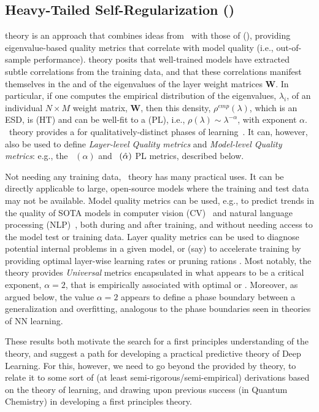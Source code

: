 \subsection{Heavy-Tailed Self-Regularization (\HTSR)}

\HTSR theory is an approach that combines ideas from \STATMECH~with those of \emph{\HeavyTailed} \emph{\RandomMatrixTheory} (\RMT),
providing eigenvalue-based quality metrics that correlate with model quality (i.e., out-of-sample performance).
\HTSR theory posits that well-trained models have extracted subtle correlations from the training data, and that these correlations manifest themselves in the \SHAPE and \SCALE of the eigenvalues of the layer weight matrices $\mathbf{W}$. 
In particular, if one computes the empirical distribution of the eigenvalues, $\lambda_i$, of an individual  $N \times M$ weight matrix, $\mathbf{W}$, then this density, $\rho^{emp}(\lambda)$, which is an ESD, is \HeavyTailed (HT) and can be well-fit to a \emph{\PowerLaw} (PL), i.e., $\rho(\lambda)\sim\lambda^{-\alpha}$, with exponent $\alpha$.
\HTSR~theory provides a \emph{\Phenomenology} for qualitatively-distinct phases of learning~\cite{MM18_TR_JMLRversion}.
It can, however, also be used to define \emph{Layer-level Quality metrics} and \emph{Model-level Quality metrics}: e.g., the \ALPHA~$(\alpha)$ and \ALPHAHAT~$(\hat\alpha)$ PL metrics, described below.

Not needing any training data, \HTSR~theory has many practical uses.
It can be directly applicable to large, open-source models where the training and test data may not be available.
Model quality metrics can be used, e.g., to predict trends in the quality of SOTA models in computer vision (CV)~\cite{MM20a_trends_NatComm} and natural language processing (NLP)~\cite{YTHx22_TR,YTHx23_KDD}, both during and after training, and without needing access to the model test or training data.
Layer quality metrics can be used to diagnose potential internal problems in a given model, or (say) to accelerate training by providing optimal layer-wise learning rates \cite{NEURIPS2023_CHM} or pruning rations \cite{alphapruning_NEURIPS2024}.
%
Most notably, the \HTSR theory provides \emph{Universal} \LayerQuality metrics encapsulated in what appears to be a critical exponent, $\alpha=2$, that is empirically associated with optimal or \IdealLearning. Moreover, as argued below, the
value $\alpha=2$ appears to define a phase boundary between a generalization and overfitting, analogous
to the phase boundaries seen in \STATMECH theories of NN learning. 

These results both motivate the search for a first principles understanding of the \HTSR theory, 
and suggest a path for developing a practical predictive theory of Deep Learning.
For this, however, we need to go beyond the \Phenomenology provided by \HTSR theory, to relate it to some sort of (at least semi-rigorous/semi-empirical) derivations based on the \STATMECH theory of learning, and drawing
upon previous success (in Quantum Chemistry) in developing a first principles \SemiEmpirical theory. 

